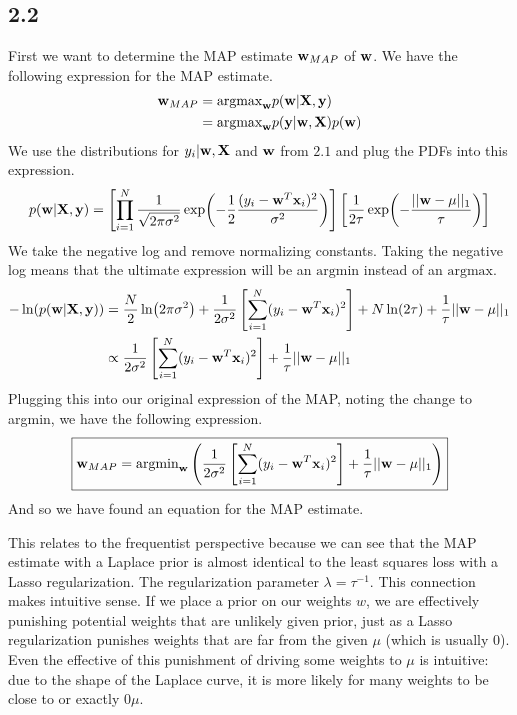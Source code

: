 \documentclass[submit]{harvardml}
\begin{document}
\subsection*{2.2}
First we want to determine the MAP estimate $\vb{w}_{MAP}$ of $\vb{w}$. We have the following expression for the MAP estimate.
\begin{align*}
    \vb{w}_{MAP} &= \text{argmax}_{\vb{w}} p(\vb{w} | \vb{X}, \vb{y}) \\
    &= \text{argmax}_{\vb{w}} p(\vb{y} | \vb{w}, \vb{X}) p(\vb{w})
\end{align*}
We use the distributions for $y_i | \vb{w}, \vb{X}$ and $\vb{w}$ from $2.1$ and plug the PDFs into this expression.
\begin{equation*}
    p(\vb{w} | \vb{X}, \vb{y}) = \left[ \prod_{i=1}^N \frac{1}{\sqrt{2 \pi \sigma^2}} \exp(-\frac{1}{2} \frac{(y_i - \vb{w}^T\vb{x}_i)^2}{\sigma^2})\right] \left[ \frac{1}{2 \tau} \exp(- \frac{||\vb{w} - \mu||_1}{\tau}) \right]
\end{equation*}
We take the negative log and remove normalizing constants. Taking the negative log means that the ultimate expression will be an $\text{argmin}$ instead of an $\text{argmax}$.
\begin{align*}
    - \ln(p(\vb{w} | \vb{X}, \vb{y})) &= \frac{N}{2}\ln(2 \pi \sigma^2) + \frac{1}{2 \sigma^2} \left[ \sum_{i=1}^N (y_i - \vb{w}^T \vb{x}_i)^2 \right] + N\ln(2 \tau) + \frac{1}{\tau} ||\vb{w} - \mu ||_1 \\
    &\propto \frac{1}{2 \sigma^2} \left[ \sum_{i=1}^N (y_i - \vb{w}^T \vb{x}_i)^2 \right] + \frac{1}{\tau} ||\vb{w} - \mu ||_1
\end{align*}
Plugging this into our original expression of the MAP, noting the change to argmin, we have the following expression.
\begin{equation*}
    \boxed{\vb{w}_{MAP} = \text{argmin}_{\vb{w}} \left( \frac{1}{2 \sigma^2} \left[ \sum_{i=1}^N (y_i - \vb{w}^T \vb{x}_i)^2 \right] + \frac{1}{\tau} ||\vb{w} - \mu ||_1 \right)}
\end{equation*}
And so we have found an equation for the MAP estimate.

This relates to the frequentist perspective because we can see that the MAP estimate with a Laplace prior is almost identical to the least squares loss with a Lasso regularization. The regularization parameter $\lambda = \tau^{-1}$. This connection makes intuitive sense. If we place a prior on our weights $w$, we are effectively punishing potential weights that are unlikely given prior, just as a Lasso regularization punishes weights that are far from the given $\mu$ (which is usually $0$). Even the effective of this punishment of driving some weights to $\mu$ is intuitive: due to the shape of the Laplace curve, it is more likely for many weights to be close to or exactly $0\mu$.
\end{document}
